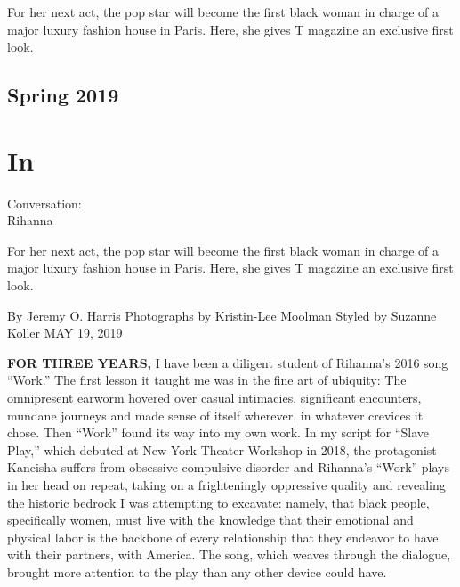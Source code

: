 For her next act, the pop star will become the first black woman in
charge of a major luxury fashion house in Paris. Here, she gives T
magazine an exclusive first look.

\hypertarget{spring-2019}{%
\subsection{Spring 2019}\label{spring-2019}}

\hypertarget{in}{%
\section{In}\label{in}}

Conversation:\\
Rihanna

For her next act, the pop star will become the first black woman in
charge of a major luxury fashion house in Paris. Here, she gives T
magazine an exclusive first look.

By Jeremy O. Harris Photographs by Kristin-Lee Moolman Styled by Suzanne
Koller MAY 19, 2019

\textbf{FOR THREE YEARS,} I have been a diligent student of Rihanna's
2016 song ``Work.'' The first lesson it taught me was in the fine art of
ubiquity: The omnipresent earworm hovered over casual intimacies,
significant encounters, mundane journeys and made sense of itself
wherever, in whatever crevices it chose. Then ``Work'' found its way
into my own work. In my script for ``Slave Play,'' which debuted at New
York Theater Workshop in 2018, the protagonist Kaneisha suffers from
obsessive-compulsive disorder and Rihanna's ``Work'' plays in her head
on repeat, taking on a frighteningly oppressive quality and revealing
the historic bedrock I was attempting to excavate: namely, that black
people, specifically women, must live with the knowledge that their
emotional and physical labor is the backbone of every relationship that
they endeavor to have with their partners, with America. The song, which
weaves through the dialogue, brought more attention to the play than any
other device could have.

